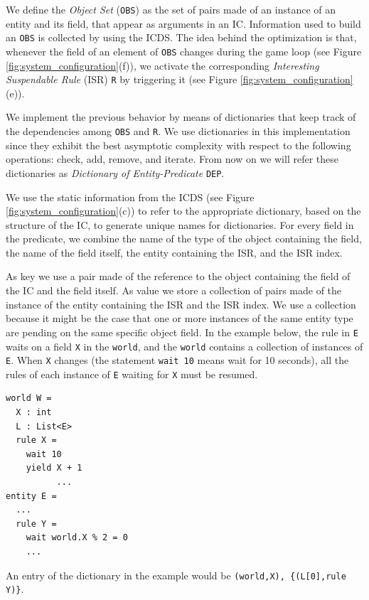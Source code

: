 We define the \emph{Object Set} (\texttt{OBS}) as the set of pairs made of an instance of an entity and its field, that appear as arguments in an IC. Information used to build an \texttt{OBS} is collected by using the ICDS. The idea behind the optimization is that, whenever the field of an element of \texttt{OBS} changes during the game loop (see Figure \ref{fig:system_configuration}(f)), we activate the corresponding \emph{Interesting Suspendable Rule} (ISR) \texttt{R} by triggering it (see Figure \ref{fig:system_configuration}(e)).


We implement the previous behavior by means of dictionaries that keep track of the dependencies among \texttt{OBS} and \texttt{R}. We use dictionaries in this implementation since they exhibit the best asymptotic complexity with respect to the following operations: check, add, remove, and iterate. From now on we will refer these dictionaries as \emph{Dictionary of Entity-Predicate} \texttt{DEP}.

We use the static information from the ICDS (see Figure \ref{fig:system_configuration}(c)) to refer to the appropriate dictionary, based on the structure of the IC, to generate unique names for dictionaries. For every field in the predicate, we combine the name of the type of the object containing the field, the name of the field itself, the entity containing the ISR, and the ISR index.

As key we use a pair made of the reference to the object containing the field of the IC and the field itself. As value we store a collection of pairs made of the instance of the entity containing the ISR and the ISR index. We use a collection because it might be the case that one or more instances of the same entity type are pending on the same specific object field. In the example below, the rule in \texttt{E} waits on a field \texttt{X} in the \texttt{world}, and the \texttt{world} contains a collection of instances of \texttt{E}. When \texttt{X} changes (the statement \texttt{wait 10} means wait for 10 seconds), all the rules of each instance of \texttt{E} waiting for \texttt{X} must be resumed.

\begin{lstlisting}
world W = 
  X : int
  L : List<E>
  rule X = 
    wait 10 
    yield X + 1
          ...
entity E = 
  ...
  rule Y = 
    wait world.X % 2 = 0
    ...
\end{lstlisting}

An entry of the dictionary in the example would be \texttt{(world,X), \{(L[0],rule Y)\}}.

